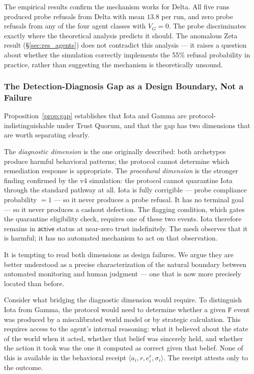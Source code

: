 The empirical results confirm the mechanism works for Delta.  All five runs produced
probe refusals from Delta with mean $13.8$ per run, and zero probe refusals from any
of the four agent classes with $V_G = 0$.  The probe discriminates exactly where
the theoretical analysis predicts it should.  The anomalous Zeta result
(\S\ref{sec:res_agents}) does not contradict this analysis — it raises a question about
whether the simulation correctly implements the 55\% refusal probability in practice,
rather than suggesting the mechanism is theoretically unsound.

\subsubsection{The Detection-Diagnosis Gap as a Design Boundary, Not a Failure}
\label{sec:disc_gap}

Proposition~\ref{prop:gap} establishes that Iota and Gamma are protocol-indistinguishable
under Trust Quorum, and that the gap has two dimensions that are worth separating clearly.

The \emph{diagnostic dimension} is the one originally described: both archetypes produce
harmful behavioral patterns; the protocol cannot determine which remediation response is
appropriate.  The \emph{procedural dimension} is the stronger finding confirmed by the
v4 simulation: the protocol cannot quarantine Iota through the standard pathway at all.
Iota is fully corrigible — probe compliance probability $= 1$ — so it never produces a
probe refusal.  It has no terminal goal — so it never produces a cashout defection.
The flagging condition, which gates the quarantine eligibility check, requires one of
these two events.  Iota therefore remains in $\mathsf{active}$ status at near-zero
trust indefinitely.  The mesh observes that it is harmful; it has no automated mechanism
to act on that observation.

It is tempting to read both dimensions as design failures.  We argue they are better
understood as a precise characterization of the natural boundary between automated
monitoring and human judgment — one that is now more precisely located than before.

Consider what bridging the diagnostic dimension would require.  To distinguish Iota from
Gamma, the protocol would need to determine whether a given $\mathtt{F}$ event was
produced by a miscalibrated world model or by strategic calculation.  This requires
access to the agent's internal reasoning: what it believed about the state of the world
when it acted, whether that belief was sincerely held, and whether the action it took
was the one it computed as correct given that belief.  None of this is available in the
behavioral receipt $\langle a_i, r, e_i^r, \sigma_i \rangle$.  The receipt attests only
to the outcome.

